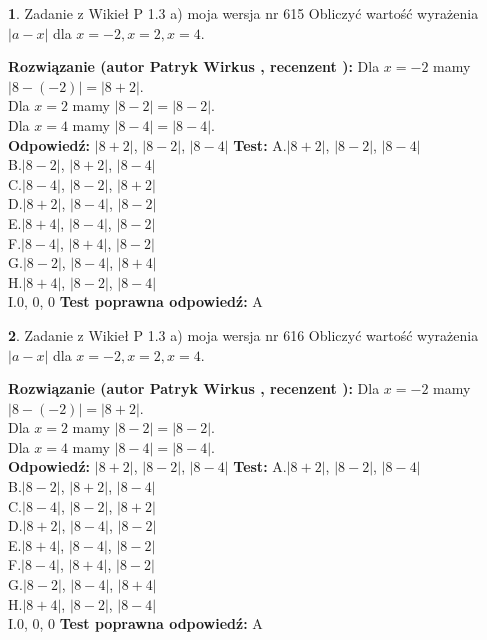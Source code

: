 \documentclass[12pt, a4paper]{article}
\theoremstyle{definition} %
\newtheorem{zad}{}
\newcommand{\zadStart}[1]{\begin{zad}#1\newline}
\newcommand{\zadStop}{\end{zad}}
\newcommand{\rozwStart}[2]{\noindent \textbf{Rozwiązanie (autor #1 , recenzent #2): }\newline}
\newcommand{\rozwStop}{\newline}
\newcommand{\odpStart}{\noindent \textbf{Odpowiedź:}\newline}
\newcommand{\odpStop}{\newline}
\newcommand{\testStart}{\noindent \textbf{Test:}\newline}
\newcommand{\testStop}{\newline}
\newcommand{\kluczStart}{\noindent \textbf{Test poprawna odpowiedź:}\newline}
\newcommand{\kluczStop}{\newline}
\begin{document}
\zadStart{Zadanie z Wikieł P 1.3 a) moja wersja nr 615}
Obliczyć wartość wyrażenia $|a - x|$ dla $x=-2,x=2,x=4$.
\zadStop
\rozwStart{Patryk Wirkus}{}
Dla $x = -2$ mamy $|8 - (-2)| = |8 + 2|$.\\
Dla $x = 2$ mamy $|8 - 2| = |8 - 2|$.\\
Dla $x = 4$ mamy $|8 - 4| = |8 - 4|$.\\
\rozwStop
\odpStart
$|8 + 2|$, $|8 - 2|$, $|8 - 4|$
\odpStop
\testStart
A.$|8 + 2|$, $|8 - 2|$, $|8 - 4|$\\
B.$|8 - 2|$, $|8 + 2|$, $|8 - 4|$\\
C.$|8 - 4|$, $|8 - 2|$, $|8 + 2|$\\
D.$|8 + 2|$, $|8 - 4|$, $|8 - 2|$\\
E.$|8 + 4|$, $|8 - 4|$, $|8 - 2|$\\
F.$|8 - 4|$, $|8 + 4|$, $|8 - 2|$\\
G.$|8 - 2|$, $|8 - 4|$, $|8 + 4|$\\
H.$|8 + 4|$, $|8 - 2|$, $|8 - 4|$\\
I.$0$, $0$, $0$
\testStop
\kluczStart
A
\kluczStop



\zadStart{Zadanie z Wikieł P 1.3 a) moja wersja nr 616}
Obliczyć wartość wyrażenia $|a - x|$ dla $x=-2,x=2,x=4$.
\zadStop
\rozwStart{Patryk Wirkus}{}
Dla $x = -2$ mamy $|8 - (-2)| = |8 + 2|$.\\
Dla $x = 2$ mamy $|8 - 2| = |8 - 2|$.\\
Dla $x = 4$ mamy $|8 - 4| = |8 - 4|$.\\
\rozwStop
\odpStart
$|8 + 2|$, $|8 - 2|$, $|8 - 4|$
\odpStop
\testStart
A.$|8 + 2|$, $|8 - 2|$, $|8 - 4|$\\
B.$|8 - 2|$, $|8 + 2|$, $|8 - 4|$\\
C.$|8 - 4|$, $|8 - 2|$, $|8 + 2|$\\
D.$|8 + 2|$, $|8 - 4|$, $|8 - 2|$\\
E.$|8 + 4|$, $|8 - 4|$, $|8 - 2|$\\
F.$|8 - 4|$, $|8 + 4|$, $|8 - 2|$\\
G.$|8 - 2|$, $|8 - 4|$, $|8 + 4|$\\
H.$|8 + 4|$, $|8 - 2|$, $|8 - 4|$\\
I.$0$, $0$, $0$
\testStop
\kluczStart
A
\kluczStop
\end{document}
